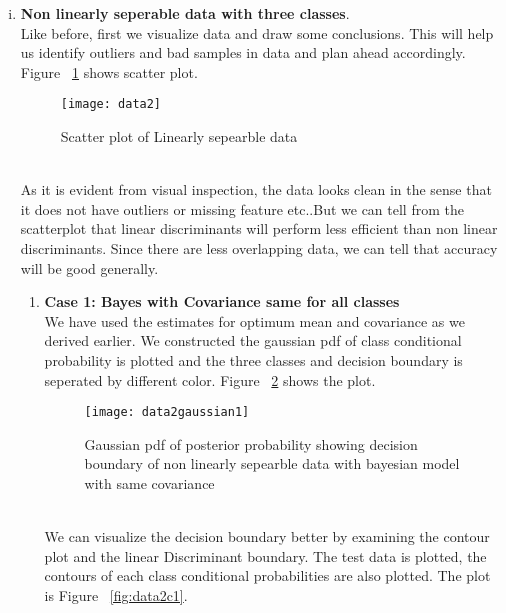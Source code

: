\documentclass[11pt,paper=a4,answers]{exam}
\begin{document}
\begin{questions}
\begin{enumerate}[i.]
    \FloatBarrier
    \item \textbf{Non linearly seperable data with three classes}.\\
        Like before, first we visualize data and draw some conclusions. This will help us identify outliers and bad samples in data and plan ahead accordingly. Figure ~\ref{fig:scatterData2} shows scatter plot.\\
        \begin{figure}[ht]
            \centering
            \texttt{[image: data2]}
            \vspace{-30pt}
            \caption{Scatter plot of Linearly sepearble data}
            \label{fig:scatterData2}
        \end{figure}\\
        As it is evident from visual inspection, the data looks clean in the sense that it does not have outliers or missing feature etc..But we can tell from the scatterplot that linear discriminants will perform less efficient than non linear discriminants. Since there are less overlapping data, we can tell that accuracy will be good generally.
        \begin{enumerate}
            \item \textbf{Case 1: Bayes with Covariance same for all classes}\\
            We have used the estimates for optimum mean and covariance as we derived earlier. We constructed the gaussian pdf of class conditional probability is plotted and the three classes and decision boundary is seperated by different color. Figure ~\ref{fig:data2g1} shows the plot.\\
            \begin{figure}[ht]
                \centering
                \texttt{[image: data2gaussian1]}
                \vspace{-30pt}
                \caption{Gaussian pdf of posterior probability showing decision boundary of non linearly sepearble data with bayesian model with same covariance}
                \label{fig:data2g1}
            \end{figure}\\
            We can visualize the decision boundary better by examining the contour plot and the linear Discriminant boundary. The test data is plotted, the contours of each class conditional probabilities are also plotted. The plot is Figure ~\ref{fig:data2c1}.\\ 
            \begin{figure}[ht]

\end{figure}
\end{enumerate}
\end{enumerate}
\end{questions}
\end{document}
